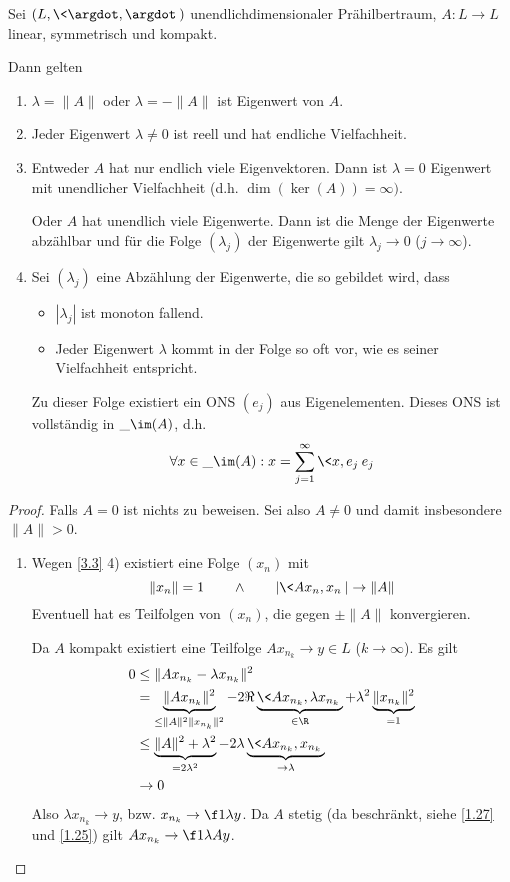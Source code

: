 \begin{st} \label{3.5}
	Sei $(L, \<\argdot,\argdot\>)$ unendlichdimensionaler Prähilbertraum, $A: L \to L$ linear, symmetrisch und kompakt.

	Dann gelten
	\begin{enumerate}[1)]
		\item
			$\lambda = \|A \|$ oder $\lambda = - \|A\|$ ist Eigenwert von $A$.
		\item
			Jeder Eigenwert $\lambda \neq 0$ ist reell und hat endliche Vielfachheit.
		\item
			Entweder $A$ hat nur endlich viele Eigenvektoren.
			Dann ist $\lambda = 0$ Eigenwert mit unendlicher Vielfachheit (d.h. $\dim (\ker (A)) = \infty)$.

			Oder $A$ hat unendlich viele Eigenwerte.
			Dann ist die Menge der Eigenwerte abzählbar und für die Folge $(\lambda_j)$ der Eigenwerte gilt $\lambda_j \to 0$ ($j \to \infty$).
		\item
			Sei $(\lambda_j)$ eine Abzählung der Eigenwerte, die so gebildet wird, dass
			\begin{itemize}
				\item
					$|\lambda_j|$ ist monoton fallend.
				\item
					Jeder Eigenwert $\lambda$ kommt in der Folge so oft vor, wie es seiner Vielfachheit entspricht.
			\end{itemize}
			Zu dieser Folge existiert ein ONS $(e_j)$ aus Eigenelementen.
			Dieses ONS ist vollständig in $\_{\im (A)}$, d.h.
			\[
				\forall x \in \_{\im(A)} : x = \sum_{j=1}^\infty \<x,e_j\> e_j
			\]
	\end{enumerate}
	\begin{proof}
		Falls $A = 0$ ist nichts zu beweisen.
		Sei also $A \neq 0$ und damit insbesondere $\|A\| > 0$.
		\begin{enumerate}[1)]
			\item
				Wegen \ref{3.3} 4) existiert eine Folge $(x_n)$ mit
				\[
					\|x_n\| = 1 \qquad \land \qquad |\<Ax_n,x_n\>| \to \|A\|
				\]
				Eventuell hat es Teilfolgen von $(x_n)$, die gegen $\pm \|A\|$ konvergieren.

				Da $A$ kompakt existiert eine Teilfolge  $Ax_{n_k} \to y \in L$ ($k \to \infty$).
				Es gilt
				\begin{align*}
					0 
					&\le \|Ax_{n_k} - \lambda x_{n_k}\|^2 \\
					&= \underbrace{\|Ax_{n_k} \|^2}_{\le \|A\|^2 \|x_{n_k}\|^2} - 2 \Re \underbrace{\< Ax_{n_k}, \lambda x_{n_k} \>}_{\in \R} + \lambda^2 \underbrace{\|x_{n_k}\|^2}_{=1} \\
					&\le \underbrace{\|A\|^2 + \lambda^2}_{=2\lambda^2} - 2 \lambda \underbrace{\<Ax_{n_k}, x_{n_k}\>}_{\to \lambda} \\
					& \to 0
				\end{align*}
				Also $\lambda x_{n_k} \to y$, bzw. $x_{n_k} \to \f 1\lambda y$.
				Da $A$ stetig (da beschränkt, siehe \ref{1.27} und \ref{1.25}) gilt $Ax_{n_k} \to \f 1\lambda A y$.


\end{enumerate}
\end{proof}
\end{st}

